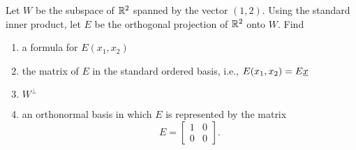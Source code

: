 \begin{problem}
Let $W$ be the subspace of $\mathbb{R}^2$ spanned by the vector $(1,2)$.
Using the standard inner product, let $E$ be the orthogonal projection of $\mathbb{R}^2$ onto $W$.
Find
\begin{enumerate}
\item a formula for $E(x_1, x_2)$
\item the matrix of $E$ in the standard ordered basis, i.e., $E(x_1, x_2) = E \underline{x}$
\item $W^{\bot}$
\item an orthonormal basis in which $E$ is represented by the matrix
\begin{equation*}
E = \left[ \begin{array}{cc} 1 & 0 \\ 0 & 0 \end{array} \right].
\end{equation*}
\end{enumerate}
\end{problem}



